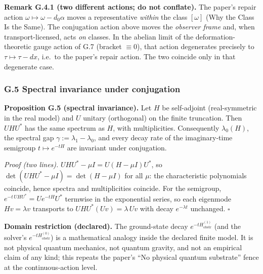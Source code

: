 \documentclass[
  11pt,
]{article}
\begin{document}
\textbf{Remark G.4.1 (two different actions; do not conflate).} The paper's repair action \(\omega\mapsto\omega-d_0\alpha\) moves a representative \emph{within} the class \([\omega]\) (Why the Class Is the Same). The conjugation action above moves the \emph{observer frame} and, when transport-licensed, acts \emph{on} classes. In the abelian limit of the deformation-theoretic gauge action of G.7 (bracket \(\equiv0\)), that action degenerates precisely to \(\tau\mapsto\tau-dx\), i.e.~to the paper's repair action. The two coincide only in that degenerate case.

\subsubsection{G.5 Spectral invariance under conjugation}\label{g.5-spectral-invariance-under-conjugation}

\textbf{Proposition G.5 (spectral invariance).} Let \(H\) be self-adjoint (real-symmetric in the real model) and \(U\) unitary (orthogonal) on the finite truncation. Then \(UHU^*\) has the same spectrum as \(H\), with multiplicities. Consequently \(\lambda_0(H)\), the spectral gap \(\gamma:=\lambda_1-\lambda_0\), and every decay rate of the imaginary-time semigroup \(t\mapsto e^{-tH}\) are invariant under conjugation.

\emph{Proof (two lines).} \(UHU^*-\mu I=U(H-\mu I)U^*\), so \(\det(UHU^*-\mu I)=\det(H-\mu I)\) for all \(\mu\): the characteristic polynomials coincide, hence spectra and multiplicities coincide. For the semigroup, \(e^{-t\,UHU^*}=U e^{-tH}U^*\) termwise in the exponential series, so each eigenmode \(Hv=\lambda v\) transports to \(UHU^*(Uv)=\lambda\,Uv\) with decay \(e^{-\lambda t}\) unchanged. \(\square\)

\textbf{Domain restriction (declared).} The ground-state decay \(e^{-tH^{(1)}_{\mathrm{obstr}}}\) (and the solver's \(e^{-tH^{(0)}_{\mathrm{obstr}}}\)) is a mathematical analogy inside the declared finite model. It is not physical quantum mechanics, not quantum gravity, and not an empirical claim of any kind; this repeats the paper's ``No physical quantum substrate'' fence at the continuous-action level.
\end{document}
